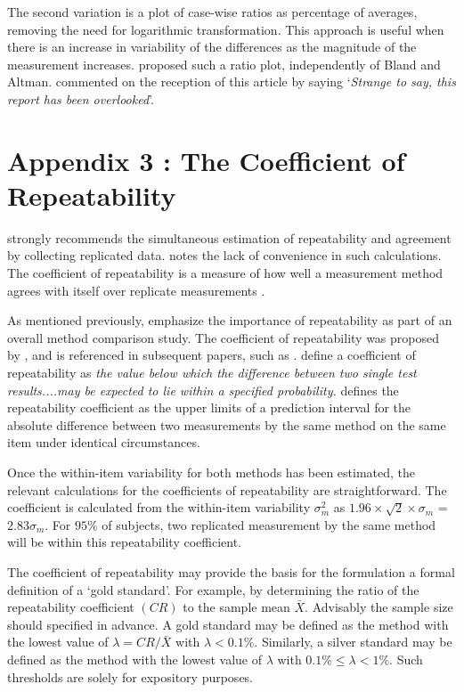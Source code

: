 \documentclass[12pt, a4paper]{report}
\theoremstyle{plain}
\theoremstyle{definition}
\theoremstyle{remark}
\begin{document}
	The second variation is a plot of case-wise ratios as percentage of averages, removing the need for logarithmic transformation. This approach is useful when there is an increase in variability of the differences as the magnitude of the measurement increases. \citet{Eksborg} proposed such a ratio plot, independently of Bland and Altman. \citet{Dewitte} commented on the reception of this article by saying `\textit{Strange to say, this report has been overlooked}'.
	
  
  \section{Appendix 3 : The Coefficient of Repeatability}
  
  
  \citet{BA99} strongly recommends the simultaneous estimation of repeatability and agreement by  collecting replicated data. \citet{ARoy2009} notes the lack of convenience in such calculations. The coefficient of repeatability is a measure of how well a measurement method agrees with itself over replicate measurements \citep{BA99}. 
  
  As mentioned previously, \citet{Barnhart} emphasize the importance of repeatability as part of an overall method comparison study. The coefficient of repeatability was proposed by \citet{BA99}, and is referenced in subsequent papers, such as \citet{BXC2008}. \citet{BSIrepeat} define a coefficient of
  repeatability as \emph{the value below which the difference between two single test results....may be expected to lie within a specified probability.} \citet{BA99} defines the repeatability coefficient as the upper limits of a prediction interval for the absolute difference between two measurements by the same method on the same item under identical circumstances. %
  
  Once the within-item variability for both methods has been estimated, the relevant calculations for the coefficients of repeatability are straightforward.
  The coefficient is calculated from the within-item variability $\sigma^2_{m}$ as  $1.96 \times \sqrt{2} \times \sigma_m$ = $2.83 \sigma_m$. For $95\%$ of subjects, two replicated measurement by the same method will be within this repeatability coefficient.
  
  
  The coefficient of repeatability may provide the basis for the formulation a formal definition of a `gold standard'. For example, by determining the ratio of the repeatability coefficient $(CR)$ to the sample mean $\bar{X}$. Advisably the sample size should specified in advance. A gold standard may be defined as the method with the lowest value of $\lambda = CR /\bar{X}$ with $\lambda < 0.1\%$. Similarly, a silver standard may be defined as the method with the lowest value of $\lambda $ with $0.1\% \leq \lambda < 1\%$. Such thresholds are solely for expository purposes.
  
\end{document}
